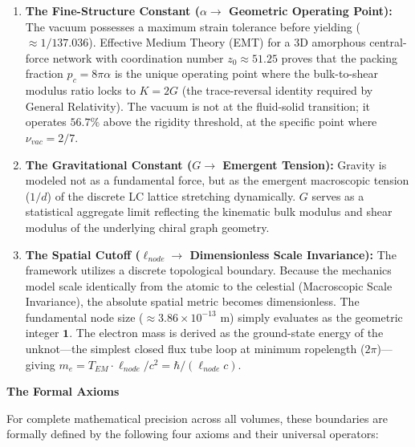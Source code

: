 \begin{enumerate}
    \item \textbf{The Fine-Structure Constant ($\alpha \to$ Geometric Operating Point):} The vacuum possesses a maximum strain tolerance before yielding ($\approx 1/137.036$). Effective Medium Theory (EMT) for a 3D amorphous central-force network with coordination number $z_0 \approx 51.25$ proves that the packing fraction $p_c = 8\pi\alpha$ is the unique operating point where the bulk-to-shear modulus ratio locks to $K = 2G$ (the trace-reversal identity required by General Relativity). The vacuum is not at the fluid-solid transition; it operates $56.7\%$ above the rigidity threshold, at the specific point where $\nu_{vac} = 2/7$.
    
    \item \textbf{The Gravitational Constant ($G \to$ Emergent Tension):} Gravity is modeled not as a fundamental force, but as the emergent macroscopic tension ($1/d$) of the discrete LC lattice stretching dynamically. $G$ serves as a statistical aggregate limit reflecting the kinematic bulk modulus and shear modulus of the underlying chiral graph geometry.

    \item \textbf{The Spatial Cutoff ($\ell_{node} \to$ Dimensionless Scale Invariance):} The framework utilizes a discrete topological boundary. Because the mechanics model scale identically from the atomic to the celestial (Macroscopic Scale Invariance), the absolute spatial metric becomes dimensionless. The fundamental node size ($\approx 3.86 \times 10^{-13}\text{ m}$) simply evaluates as the geometric integer $\mathbf{1}$. The electron mass is derived as the ground-state energy of the unknot---the simplest closed flux tube loop at minimum ropelength ($2\pi$)---giving $m_e = T_{EM} \cdot \ell_{node} / c^2 = \hbar / (\ell_{node} c)$.
\end{enumerate}

\vspace{1.5em}
\noindent \textbf{The Formal Axioms}

\noindent For complete mathematical precision across all volumes, these boundaries are formally defined by the following four axioms and their universal operators:







